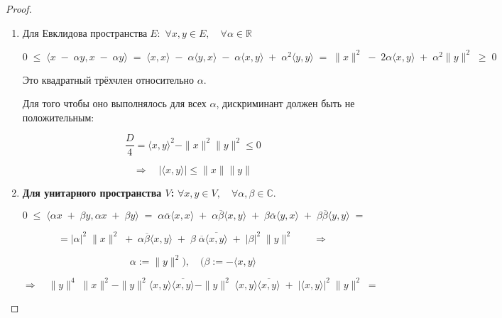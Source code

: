 \documentclass[12px]{report}
\begin{document}
\vspace{0.2cm}
\begin{proof}



    \begin{enumerate}
        \item 
        
        $\textbf{Для Евклидова пространства} \; E:$ \; $\forall x, y \in E, \quad \forall \alpha \in \mathbb{R}$
        
        $$0 \; \leq \; \langle x \; - \; \alpha y, x \; - \; \alpha y \rangle \; = \; \langle x, x \rangle \; - \; \alpha \langle y, x \rangle \; - \; \alpha \langle x, y \rangle \; + \; \alpha^2 \langle y, y \rangle \; = \; \|x\|^2 \; - \; 2 \alpha \langle x, y \rangle \; + \; \alpha^2 \|y\|^2 \; \geq \; 0$$
        
        Это квадратный трёхчлен относительно \( \alpha \). 
        
        Для того чтобы оно выполнялось для всех \( \alpha \), дискриминант должен быть не положительным:
        
        $$\frac{D}{4} = \langle x, y \rangle^2 - \|x\|^2 \|y\|^2 \leq 0$$
        
        
        $$\Longrightarrow \quad |\langle x, y \rangle| \leq \|x\| \|y\|$$
        
    \item \textbf{Для унитарного пространства \( V \):} \quad $\forall x, y \in V, \quad \forall \alpha, \beta \in \mathbb{C}$.
        
        $$0 \; \leq \; \langle \alpha x \; + \; \beta y, \alpha x \; + \; \beta y \rangle \; = \; \alpha \overline{\alpha} \langle x, x \rangle \; + \; \alpha \overline{\beta} \langle x, y \rangle \; + \; \beta \overline{\alpha} \langle y, x \rangle \; + \; \beta \overline{\beta} \langle y, y \rangle \; =$$
        
        $$= |\alpha|^2 \; \|x\|^2 \; + \; \alpha \overline{\beta} \langle x, y \rangle \; + \; \beta \; \overline{\alpha} \overline{\langle x, y \rangle } \; + \; |\beta|^2 \; \|y\|^2 \qquad \Longrightarrow$$
        
        $$\alpha := \|y\|^2 ) , \quad ( \beta := -\langle x, y \rangle$$
 
        $$\Longrightarrow \quad \|y\|^4 \; \|x\|^2 - \|y\|^2 \langle x, y \rangle \overline{\langle x, y \rangle} - \|y\|^2 \; \langle x, y \rangle \overline{\langle x, y \rangle} \; + \; |\langle x, y \rangle |^2 \; \|y\|^2 \; =$$
        

\end{enumerate}
\end{proof}
\end{document}
